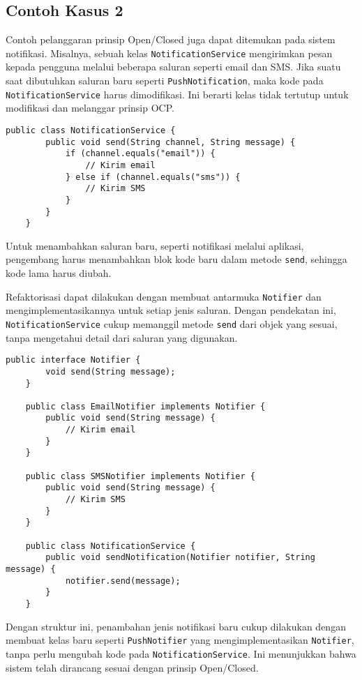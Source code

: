 \subsection{Contoh Kasus 2}
Contoh pelanggaran prinsip Open/Closed juga dapat ditemukan pada sistem notifikasi. Misalnya, sebuah kelas \texttt{NotificationService} mengirimkan pesan kepada pengguna melalui beberapa saluran seperti email dan SMS. Jika suatu saat dibutuhkan saluran baru seperti \texttt{PushNotification}, maka kode pada \texttt{NotificationService} harus dimodifikasi. Ini berarti kelas tidak tertutup untuk modifikasi dan melanggar prinsip OCP.

\begin{lstlisting}[style=JavaStyle, caption={Contoh pelanggaran OCP}]
	public class NotificationService {
		public void send(String channel, String message) {
			if (channel.equals("email")) {
				// Kirim email
			} else if (channel.equals("sms")) {
				// Kirim SMS
			}
		}
	}
\end{lstlisting}

Untuk menambahkan saluran baru, seperti notifikasi melalui aplikasi, pengembang harus menambahkan blok kode baru dalam metode \texttt{send}, sehingga kode lama harus diubah.

Refaktorisasi dapat dilakukan dengan membuat antarmuka \texttt{Notifier} dan mengimplementasikannya untuk setiap jenis saluran. Dengan pendekatan ini, \texttt{NotificationService} cukup memanggil metode \texttt{send} dari objek yang sesuai, tanpa mengetahui detail dari saluran yang digunakan.

\begin{lstlisting}[style=JavaStyle, caption={Refaktor menggunakan OCP}]
	public interface Notifier {
		void send(String message);
	}
	
	public class EmailNotifier implements Notifier {
		public void send(String message) {
			// Kirim email
		}
	}
	
	public class SMSNotifier implements Notifier {
		public void send(String message) {
			// Kirim SMS
		}
	}
	
	public class NotificationService {
		public void sendNotification(Notifier notifier, String message) {
			notifier.send(message);
		}
	}
\end{lstlisting}

Dengan struktur ini, penambahan jenis notifikasi baru cukup dilakukan dengan membuat kelas baru seperti \texttt{PushNotifier} yang mengimplementasikan \texttt{Notifier}, tanpa perlu mengubah kode pada \texttt{NotificationService}. Ini menunjukkan bahwa sistem telah dirancang sesuai dengan prinsip Open/Closed.


